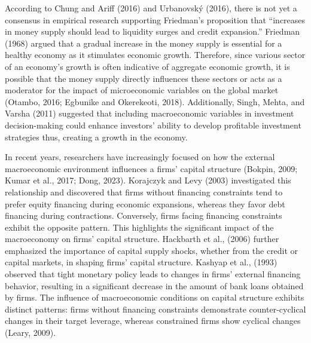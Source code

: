 \documentclass[11pt]{article}
\begin{document}
According to Chung and Ariff (2016) and Urbanovský (2016), there is not
yet a consensus in empirical research supporting Friedman's proposition
that ``increases in money supply should lead to liquidity surges and
credit expansion.'' Friedman (1968) argued that a gradual increase in
the money supply is essential for a healthy economy as it stimulates
economic growth. Therefore, since various sector of an economy's growth
is often indicative of aggregate economic growth, it is possible that
the money supply directly influences these sectors or acts as a
moderator for the impact of microeconomic variables on the global market
(Otambo, 2016; Egbunike and Okerekeoti, 2018). Additionally, Singh,
Mehta, and Varsha (2011) suggested that including macroeconomic
variables in investment decision-making could enhance investors' ability
to develop profitable investment strategies thus, creating a growth in
the economy.

In recent years, researchers have increasingly focused on how the
external macroeconomic environment influences a firms' capital structure
(Bokpin, 2009; Kumar et al., 2017; Dong, 2023). Korajczyk and Levy
(2003) investigated this relationship and discovered that firms without
financing constraints tend to prefer equity financing during economic
expansions, whereas they favor debt financing during contractions.
Conversely, firms facing financing constraints exhibit the opposite
pattern. This highlights the significant impact of the macroeconomy on
firms' capital structure. Hackbarth et al., (2006) further emphasized
the importance of capital supply shocks, whether from the credit or
capital markets, in shaping firms' capital structure. Kashyap et al.,
(1993) observed that tight monetary policy leads to changes in firms'
external financing behavior, resulting in a significant decrease in the
amount of bank loans obtained by firms. The influence of macroeconomic
conditions on capital structure exhibits distinct patterns: firms
without financing constraints demonstrate counter-cyclical changes in
their target leverage, whereas constrained firms show cyclical changes
(Leary, 2009).
\end{document}

